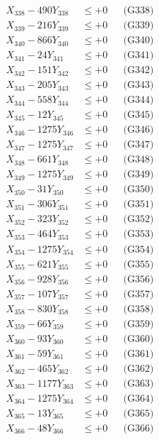 \documentclass[a4paper,10pt]{article}
\begin{document}
{\begin{align}
X_{338} - 490Y_{338} &\leq +0 && \text{(G338)} \\
X_{339} - 216Y_{339} &\leq +0 && \text{(G339)} \\
X_{340} - 866Y_{340} &\leq +0 && \text{(G340)} \\
\allowbreak
X_{341} - 24Y_{341} &\leq +0 && \text{(G341)} \\
X_{342} - 151Y_{342} &\leq +0 && \text{(G342)} \\
X_{343} - 205Y_{343} &\leq +0 && \text{(G343)} \\
X_{344} - 558Y_{344} &\leq +0 && \text{(G344)} \\
X_{345} - 12Y_{345} &\leq +0 && \text{(G345)} \\
X_{346} - 1275Y_{346} &\leq +0 && \text{(G346)} \\
X_{347} - 1275Y_{347} &\leq +0 && \text{(G347)} \\
X_{348} - 661Y_{348} &\leq +0 && \text{(G348)} \\
X_{349} - 1275Y_{349} &\leq +0 && \text{(G349)} \\
X_{350} - 31Y_{350} &\leq +0 && \text{(G350)} \\
\allowbreak
X_{351} - 306Y_{351} &\leq +0 && \text{(G351)} \\
X_{352} - 323Y_{352} &\leq +0 && \text{(G352)} \\
X_{353} - 464Y_{353} &\leq +0 && \text{(G353)} \\
X_{354} - 1275Y_{354} &\leq +0 && \text{(G354)} \\
X_{355} - 621Y_{355} &\leq +0 && \text{(G355)} \\
X_{356} - 928Y_{356} &\leq +0 && \text{(G356)} \\
X_{357} - 107Y_{357} &\leq +0 && \text{(G357)} \\
X_{358} - 830Y_{358} &\leq +0 && \text{(G358)} \\
X_{359} - 66Y_{359} &\leq +0 && \text{(G359)} \\
X_{360} - 93Y_{360} &\leq +0 && \text{(G360)} \\
\allowbreak
X_{361} - 59Y_{361} &\leq +0 && \text{(G361)} \\
X_{362} - 465Y_{362} &\leq +0 && \text{(G362)} \\
X_{363} - 1177Y_{363} &\leq +0 && \text{(G363)} \\
X_{364} - 1275Y_{364} &\leq +0 && \text{(G364)} \\
X_{365} - 13Y_{365} &\leq +0 && \text{(G365)} \\
X_{366} - 48Y_{366} &\leq +0 && \text{(G366)} \\

\end{align}}
\end{document}
